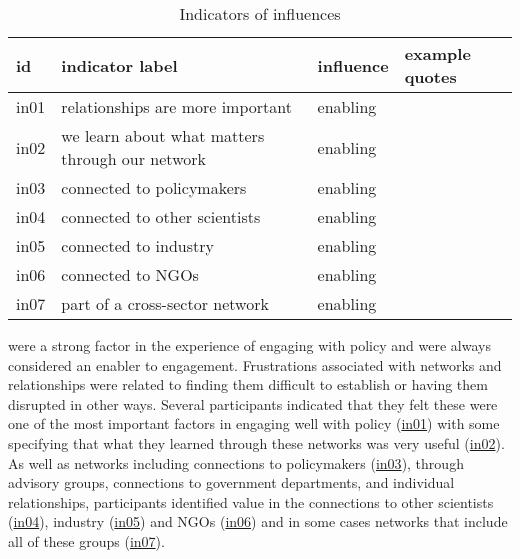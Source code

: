 \begin{table}[!ht]
\footnotesize
\caption{Indicators of \skinetw{} influences}\label{tab:resskinetw}
\begin{tabular}{L{.07\linewidth}L{.3\linewidth}L{.11\linewidth}L{.52\linewidth}} \hline
\textbf{id} & \textbf{indicator label} & \textbf{influence} & \textbf{example quotes} \\ \hline \hline 
in01 & relationships are more important & enabling &  \\[5mm]
in02 & we learn about what matters through our network & enabling &  \\[5mm]
in03 & connected to policymakers & enabling &  \\[5mm]
in04 & connected to other scientists & enabling &  \\[5mm]
in05 & connected to industry & enabling &  \\[5mm]
in06 & connected to NGOs & enabling &  \\[5mm]
in07 & part of a cross-sector network & enabling &  \\[5mm]
\hline
\end{tabular}
\end{table}

\skinetw{} were a strong factor in the experience of engaging with policy and were always considered an enabler to engagement. Frustrations associated with networks and relationships were related to finding them difficult to establish or having them disrupted in other ways. Several participants indicated that they felt these were one of the most important factors in engaging well with policy (\hyperref[tab:resskinetw]{in01}) with some specifying that what they learned through these networks was very useful (\hyperref[tab:resskinetw]{in02}). As well as networks including connections to policymakers (\hyperref[tab:resskinetw]{in03}), through advisory groups, connections to government departments, and individual relationships, participants identified value in the connections to other scientists (\hyperref[tab:resskinetw]{in04}), industry (\hyperref[tab:resskinetw]{in05}) and NGOs (\hyperref[tab:resskinetw]{in06}) and in some cases networks that include all of these groups (\hyperref[tab:resskinetw]{in07}).

